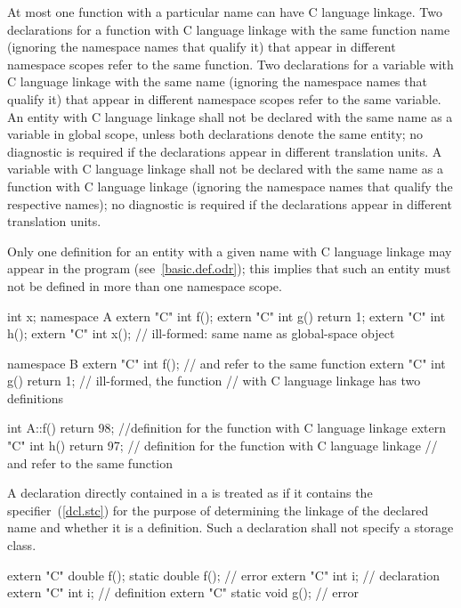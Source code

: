\pnum
{}%
At most one function with a particular name can have C language linkage.
Two declarations for a function with C language linkage with the same
function name (ignoring the namespace names that qualify it) that appear
in different namespace scopes refer to the same function. Two
declarations for a variable with C language linkage with the same name
(ignoring the namespace names that qualify it) that appear in different
namespace scopes refer to the same variable.
An entity with C language linkage shall not be declared with the same name
as a variable in global scope, unless both declarations denote the same entity;
no diagnostic is required if the declarations appear in different translation units.
A variable with C language linkage shall not be declared with the same name as a
function with C language linkage (ignoring the namespace names that qualify the
respective names); no diagnostic is required if the declarations appear in
different translation units.
\begin{note}
Only
one definition for an entity with a given name
with C language linkage may appear in the
program (see~\ref{basic.def.odr});
this implies that such an entity
must not be defined in more
than one namespace scope.\end{note}
\begin{example}

\begin{codeblock}
int x;
namespace A {
  extern "C" int f();
  extern "C" int g() { return 1; }
  extern "C" int h();
  extern "C" int x();               // ill-formed: same name as global-space object 
}

namespace B {
  extern "C" int f();               //  and  refer to the same function
  extern "C" int g() { return 1; }  // ill-formed, the function 
                                    // with C language linkage has two definitions
}

int A::f() { return 98; }           //definition for the function  with C language linkage
extern "C" int h() { return 97; }   // definition for the function  with C language linkage
                                    //  and  refer to the same function
\end{codeblock}
\end{example}

\pnum
A declaration directly contained in a
is treated as if it contains the
specifier~(\ref{dcl.stc}) for the purpose of determining the linkage of the
declared name and whether it is a definition. Such a declaration shall
not specify a storage class.
\begin{example}

\begin{codeblock}
extern "C" double f();
static double f();                  // error
extern "C" int i;                   // declaration
extern "C" {
  int i;                            // definition
}
extern "C" static void g();         // error
\end{codeblock}
\end{example}

